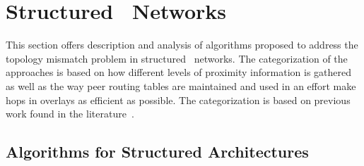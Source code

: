 \section{Structured \p\ Networks}
\label{section:structured}

This section offers description and analysis of algorithms proposed
to address the topology mismatch problem in structured \p\ networks. 
The categorization of the approaches is based on how different
levels of proximity information is gathered as well as  
the way peer routing tables are maintained and used in an effort make hops in
overlays as efficient as possible. 
The categorization is based on previous work found in the
literature~\cite{CDHR2002,CDCR2002,RSS2002}.

\subsection{Algorithms for Structured Architectures}






